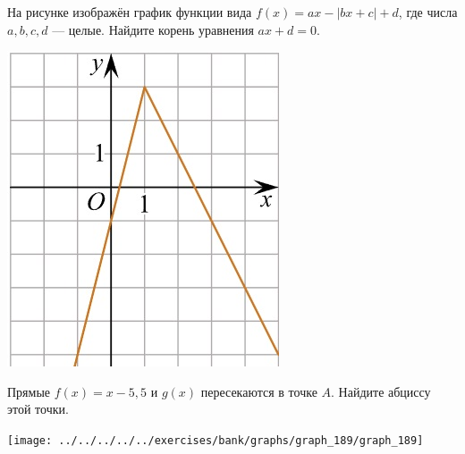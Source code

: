 \begin{exam}
\begin{listofex}
\begin{minipage}[t]{0.43\textwidth}
				На рисунке изображён график функции вида \(f(x)=ax-|bx+c|+d\), где числа \(a, b, c, d\) --- целые. Найдите корень уравнения \(ax+d=0\).
			\end{minipage}
			\begin{minipage}[c]{0.11\textwidth}
				\includegraphics[align=t, width=\textwidth]{../../pics/G111M4C5-3.jpg}
			\end{minipage}
			\item \begin{minipage}[t]{0.43\textwidth}
				Прямые \( f(x)=x-5,5 \) и \( g(x) \) пересекаются в точке \( A \). Найдите абциссу этой точки.
			\end{minipage}
			\hspace{0.05\textwidth}
			\begin{minipage}[c]{0.11\textwidth}
				\texttt{[image: ../../../../../exercises/bank/graphs/graph\_189/graph\_189]}
			\end{minipage}
		\end{listofex}
	\end{exam}
	

